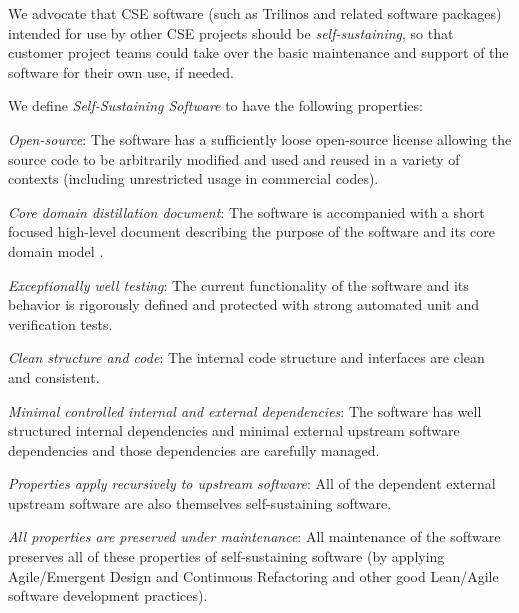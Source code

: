 \documentclass[11pt]{SANDreport}
\begin{document}
We advocate that CSE software (such as Trilinos and related software
packages) intended for use by other CSE projects should be
{}\textit{self-sustaining}, so that customer project teams could take
over the basic maintenance and support of the software for their own
use, if needed.

We define {}\textit{Self-Sustaining Software} to have the following
properties:
%
\begin{compactitem}

{}\item\textit{Open-source}: The software has a sufficiently loose
open-source license allowing the source code to be arbitrarily modified
and used and reused in a variety of contexts (including unrestricted
usage in commercial codes).

{}\item\textit{Core domain distillation document}: The software is
accompanied with a short focused high-level document describing the
purpose of the software and its core domain model
{}\cite{DomainDrivenDesign}.

{}\item\textit{Exceptionally well testing}: The current functionality
of the software and its behavior is rigorously defined and protected
with strong automated unit and verification tests.

{}\item\textit{Clean structure and code}: The internal code structure
and interfaces are clean and consistent.

{}\item\textit{Minimal controlled internal and external dependencies}:
The software has well structured internal dependencies and minimal
external upstream software dependencies and those dependencies are
carefully managed.

{}\item\textit{Properties apply recursively to upstream software}: All
of the dependent external upstream software are also themselves
self-sustaining software.

{}\item\textit{All properties are preserved under maintenance}: All
maintenance of the software preserves all of these properties of
self-sustaining software (by applying Agile/Emergent Design and
Continuous Refactoring and other good Lean/Agile software development
practices).

\end{compactitem}
\end{document}
